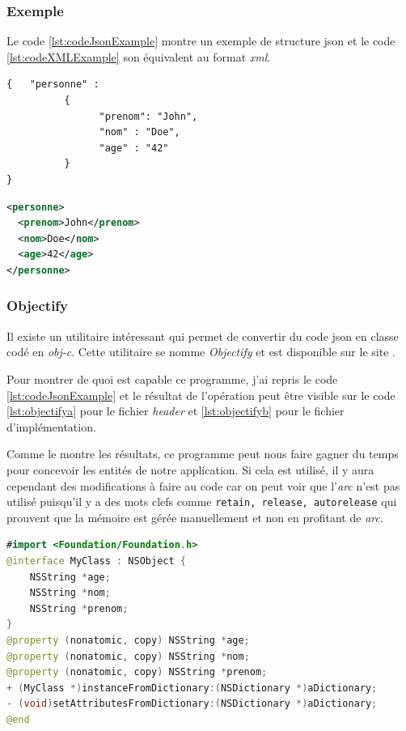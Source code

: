 \subsubsection{Exemple}
Le code \ref{lst:codeJsonExample} montre un exemple de structure \gls{json} et le code \ref{lst:codeXMLExample} son équivalent au format \emph{\gls{xml}}.
\begin{lstlisting}[language={XML}, caption={Exemple code JSON}, label={lst:codeJsonExample}]
{   "personne" :
          {     
                "prenom": "John",
                "nom" : "Doe",
                "age" : "42"
          }
}
\end{lstlisting}

\begin{lstlisting}[language={XML}, caption={Comparaison XML-JSON}, label={lst:codeXMLExample}]
<personne>
  <prenom>John</prenom>
  <nom>Doe</nom>
  <age>42</age>
</personne>
\end{lstlisting}

\subsubsection{Objectify}
Il existe un utilitaire intéressant qui permet de convertir du code \gls{json} en classe codé en \emph{\gls{obj-c}}. Cette utilitaire se nomme \emph{Objectify} et est disponible sur le site \cite{online:objectify}.

\medskip

Pour montrer de quoi est capable ce programme, j'ai repris le code \ref{lst:codeJsonExample} et le résultat de l'opération peut être visible sur le code \ref{lst:objectifya} pour le fichier \emph{header} et \ref{lst:objectifyb} pour le fichier d'implémentation.

\medskip

Comme le montre les résultats, ce programme peut nous faire gagner du temps pour concevoir les entités de notre application. Si cela est utilisé, il y aura cependant des modifications à faire au code car on peut voir que l'\emph{\gls{arc}} n'est pas utilisé puisqu'il y a des mots clefs comme \texttt{retain, release, autorelease} qui prouvent que la mémoire est gérée manuellement et non en profitant de \emph{\gls{arc}}.

\begin{lstlisting}[language={JAVA}, caption={Objectify - Resultat du fichier.h}, label={lst:objectifya}]
#import <Foundation/Foundation.h>
@interface MyClass : NSObject {
    NSString *age;
    NSString *nom;
    NSString *prenom;
}
@property (nonatomic, copy) NSString *age;
@property (nonatomic, copy) NSString *nom;
@property (nonatomic, copy) NSString *prenom;
+ (MyClass *)instanceFromDictionary:(NSDictionary *)aDictionary;
- (void)setAttributesFromDictionary:(NSDictionary *)aDictionary;
@end
\end{lstlisting}

